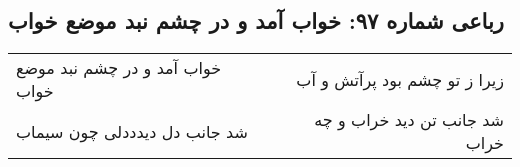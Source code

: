 \begin{center}
\section*{رباعی شماره ۹۷: خواب آمد و در چشم نبد موضع خواب}
\label{sec:0097}
\begin{longtable}{l p{0.5cm} r}
خواب آمد و در چشم نبد موضع خواب
&&
زیرا ز تو چشم بود پرآتش و آب
\\
شد جانب دل دیدددلی چون سیماب
&&
شد جانب تن دید خراب و چه خراب
\\
\end{longtable}
\end{center}
